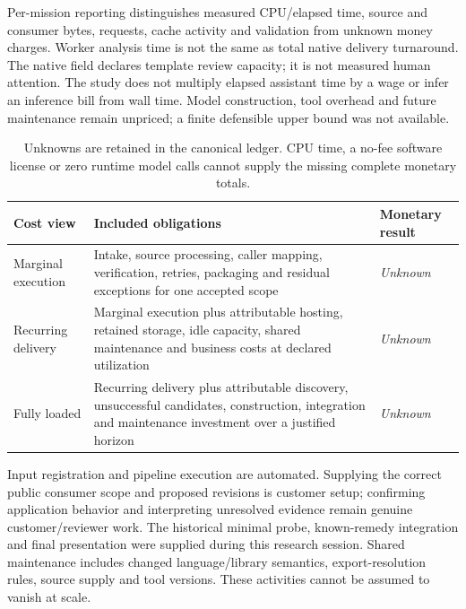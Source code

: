\documentclass[11pt,letterpaper]{article}
\newcommand{\pathcode}[1]{{\small\ttfamily\detokenize{#1}}}
\newcommand{\unknown}{\textit{Unknown}}
\begin{document}
Per-mission reporting distinguishes measured CPU/elapsed time, source and consumer bytes, requests, cache activity and validation from unknown money charges. Worker analysis time is not the same as total native delivery turnaround. The native \pathcode{reviewMinutes: 1} field declares template review capacity; it is not measured human attention. The study does not multiply elapsed assistant time by a wage or infer an inference bill from wall time. Model construction, tool overhead and future maintenance remain unpriced; a finite defensible upper bound was not available.

\begin{table}[H]\small
\begin{tabularx}{\textwidth}{@{}p{1.28in}Yp{1.1in}@{}}\toprule
Cost view & Included obligations & Monetary result\\\midrule
Marginal execution & Intake, source processing, caller mapping, verification, retries, packaging and residual exceptions for one accepted scope & \unknown\\
Recurring delivery & Marginal execution plus attributable hosting, retained storage, idle capacity, shared maintenance and business costs at declared utilization & \unknown\\
Fully loaded & Recurring delivery plus attributable discovery, unsuccessful candidates, construction, integration and maintenance investment over a justified horizon & \unknown\\\bottomrule
\end{tabularx}
\caption{Unknowns are retained in the canonical ledger. CPU time, a no-fee software license or zero runtime model calls cannot supply the missing complete monetary totals.}
\end{table}

Input registration and pipeline execution are automated. Supplying the correct public consumer scope and proposed revisions is customer setup; confirming application behavior and interpreting unresolved evidence remain genuine customer/reviewer work. The historical minimal probe, known-remedy integration and final presentation were supplied during this research session. Shared maintenance includes changed language/library semantics, export-resolution rules, source supply and tool versions. These activities cannot be assumed to vanish at scale.
\end{document}

